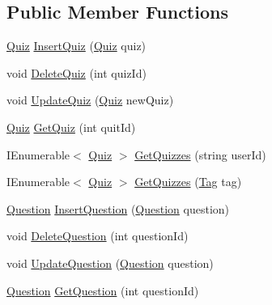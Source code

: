 \subsection*{Public Member Functions}
\begin{DoxyCompactItemize}
\item 
\hyperlink{class_website_1_1_models_1_1_quiz}{Quiz} \hyperlink{interface_website_1_1_models_1_1_i_d_a_l_e_f_a61228b5cdd40c2bef774213e9d51f630}{Insert\+Quiz} (\hyperlink{class_website_1_1_models_1_1_quiz}{Quiz} quiz)
\item 
void \hyperlink{interface_website_1_1_models_1_1_i_d_a_l_e_f_a8136eefeb0452315ef1299a953883cad}{Delete\+Quiz} (int quiz\+Id)
\item 
void \hyperlink{interface_website_1_1_models_1_1_i_d_a_l_e_f_af62c591278df17d47e48ed05dff6f575}{Update\+Quiz} (\hyperlink{class_website_1_1_models_1_1_quiz}{Quiz} new\+Quiz)
\item 
\hyperlink{class_website_1_1_models_1_1_quiz}{Quiz} \hyperlink{interface_website_1_1_models_1_1_i_d_a_l_e_f_a442aa4fbeb4a619ffef1eecc70af388c}{Get\+Quiz} (int quit\+Id)
\item 
I\+Enumerable$<$ \hyperlink{class_website_1_1_models_1_1_quiz}{Quiz} $>$ \hyperlink{interface_website_1_1_models_1_1_i_d_a_l_e_f_a40e7c464a04ba57cda4ffbcbaf6165b2}{Get\+Quizzes} (string user\+Id)
\item 
I\+Enumerable$<$ \hyperlink{class_website_1_1_models_1_1_quiz}{Quiz} $>$ \hyperlink{interface_website_1_1_models_1_1_i_d_a_l_e_f_ad2c4cb53832486bda1bea8a274b3e0ed}{Get\+Quizzes} (\hyperlink{class_website_1_1_models_1_1_tag}{Tag} tag)
\item 
\hyperlink{class_website_1_1_models_1_1_question}{Question} \hyperlink{interface_website_1_1_models_1_1_i_d_a_l_e_f_a6234d208bd5d601420182ba55a9330fe}{Insert\+Question} (\hyperlink{class_website_1_1_models_1_1_question}{Question} question)
\item 
void \hyperlink{interface_website_1_1_models_1_1_i_d_a_l_e_f_ac04f4c4a130135fdc83fbd4a11361fb6}{Delete\+Question} (int question\+Id)
\item 
void \hyperlink{interface_website_1_1_models_1_1_i_d_a_l_e_f_a9ce1de4b2c73d94829ea4fd178dad901}{Update\+Question} (\hyperlink{class_website_1_1_models_1_1_question}{Question} question)
\item 
\hyperlink{class_website_1_1_models_1_1_question}{Question} \hyperlink{interface_website_1_1_models_1_1_i_d_a_l_e_f_aa0b9f3b3259d91f96cbd6ccc6b9ac967}{Get\+Question} (int question\+Id)
\item 

\end{DoxyCompactItemize}
